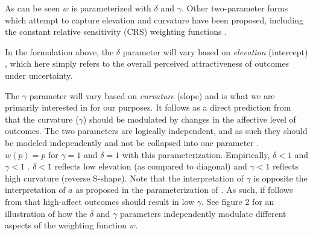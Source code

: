 \documentclass[12pt]{article}
\begin{document}
As can be seen $w$ is parameterized with
$\delta$ and $\gamma$. Other two-parameter
forms which attempt to capture elevation and
curvature have been proposed, including the
constant relative sensitivity (CRS) weighting
functions \autocite{abdellaoui2010separating}.

\vspace{3mm}

In the formulation above, the
$\delta$ parameter will vary based on
\emph{elevation} (intercept)
\autocite{gonzalez1999shape},
which here simply refers to the overall
perceived attractiveness of outcomes
under uncertainty.

\vspace{3mm}

The $\gamma$ parameter will vary based on
\emph{curvature} (slope)
\autocite{gonzalez1999shape} and is what we
are primarily interested in for our purposes.
It follows as a direct prediction from
\textcite{rottenstreich2001money} that the
curvature ($\gamma$) should be modulated by changes in
the affective level of outcomes.
The two parameters are logically independent,
and as such they should be modeled
independently and not be collapsed into one
parameter \autocite{abdellaoui2010separating,
gonzalez1999shape}. \\

$w(p) = p$ for  $\gamma = 1$ and $\delta = 1$
with this parameterization. Empirically,
$\delta < 1$ and $\gamma < 1$
\autocite{gonzalez1999shape}. $\delta < 1$
reflects low elevation (as compared to diagonal)
and  $\gamma < 1$ reflects high curvature
(reverse S-shape). Note that the interpretation
of $\gamma$ is opposite the interpretation of
$a$ as proposed in the parameterization of
\textcite{rottenstreich2001money}. As such,
if follows from \textcite{rottenstreich2001money}
that high-affect outcomes should result in low
$\gamma$.
See figure 2 for an
illustration of how the $\delta$
and $\gamma$ parameters independently modulate
different aspects of the weighting function $w$.
\end{document}

